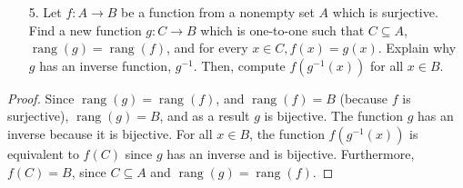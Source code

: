\documentclass[10pt]{article}
\theoremstyle{definition}
\theoremstyle{plain}
\DeclareMathOperator\rang{rang}
\begin{document}
\pagebreak



\begin{enumerate}
\item[5.] Let $f:A \to B$ be a function from a nonempty set $A$ which is surjective.  Find a new function $g:C \to B$ which is one-to-one such that $C \subseteq A$, $\rang(g) = \rang(f)$, and for every $x \in C, f(x) = g(x)$.  Explain why $g$ has an inverse function, $g^{-1}$.  Then, compute $f(g^{-1}(x))$ for all $x \in B$.
\end{enumerate}



\begin{proof}
  Since $\rang(g) = \rang(f)$, and $\rang(f) = B$ (because $f$ is surjective), $\rang(g) = B$, and as a result $g$ is bijective. The function $g$ has an inverse because it is bijective. For all $x \in B$, the function $f(g^{-1}(x))$ is equivalent to $f(C)$ since $g$ has an inverse and is bijective. Furthermore, $f(C)=B$, since $C\subseteq A$ and $\rang(g) = \rang(f)$.
\end{proof}
\end{document}
